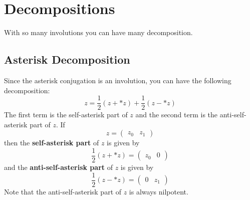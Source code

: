 \section{Decompositions}
With so many involutions you can have many decomposition.
\subsection{Asterisk Decomposition}
Since the asterisk conjugation is an involution, you can have the following decomposition:
\begin{equation}
    z = \frac{1}{2} \left( z + {\ast z} \right) + \frac{1}{2} \left( z - {\ast z} \right)
\end{equation}
The first term is the self-asterisk part of $z$ and the second term is the anti-self-asterisk part of $z$. If
\begin{equation}
    z = \begin{pmatrix}
        z_{0} & z_{1}
    \end{pmatrix}
\end{equation}
then the \textbf{self-asterisk part} of $z$ is given by
\begin{equation}
    \frac{1}{2} \left( z + {\ast z} \right) = \begin{pmatrix}
        z_{0} & 0
    \end{pmatrix}
\end{equation}
and the \textbf{anti-self-asterisk part} of $z$ is given by
\begin{equation}
    \frac{1}{2} \left( z - {\ast z} \right) = \begin{pmatrix}
        0 & z_{1}
    \end{pmatrix}
\end{equation}
Note that the anti-self-asterisk part of $z$ is always nilpotent.
